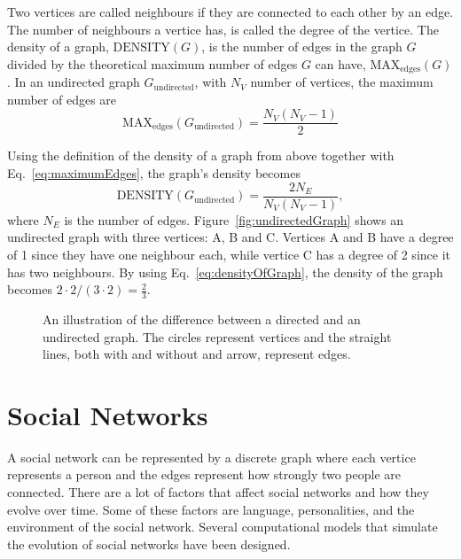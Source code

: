 Two vertices are called neighbours if they are connected to each other by an edge. The number of neighbours a vertice has, is called the degree of the vertice. The density of a graph, $\mathrm{DENSITY}(G)$, is the number of edges in the graph $G$ divided by the theoretical maximum number of edges $G$ can have, $\mathrm{MAX}_\mathrm{edges}(G)$. In an undirected graph $G_\mathrm{undirected}$, with $N_V$ number of vertices, the maximum number of edges are
\begin{equation}\label{eq:maximumEdges}
\mathrm{MAX}_\mathrm{edges}(G_\mathrm{undirected}) = \frac{N_V(N_V-1)}{2}
\end{equation}

Using the definition of the density of a graph from above together with Eq.~\eqref{eq:maximumEdges}, the graph's density becomes
\begin{equation}\label{eq:densityOfGraph}
\mathrm{DENSITY}(G_\mathrm{undirected}) = \frac{2 N_E}{N_V(N_V-1)},
\end{equation}
where $N_E$ is the number of edges. Figure~\ref{fig:undirectedGraph} shows an undirected graph with three vertices: A, B and C. Vertices A and B have a degree of 1 since they have one neighbour each, while vertice C has a degree of 2 since it has two neighbours. By using Eq.~\eqref{eq:densityOfGraph}, the density of the graph becomes $2\cdot2 / (3\cdot2) = \frac{2}{3}$.

\begin{figure}[htbp]
    \centering
    \hfill
    \hfill
    \hfill
    \caption[The difference between a directed and an undirected graph.]{An illustration of the difference between  a directed and  an undirected graph. The circles represent vertices and the straight lines, both with and without and arrow, represent edges.}
    \label{fig:graph}
\end{figure}

\acresetall
\section{Social Networks}
A social network can be represented by a discrete graph where each vertice represents a person and the edges represent how strongly two people are connected. There are a lot of factors that affect social networks and how they evolve over time. Some of these factors are language, personalities, and the environment of the social network. Several computational models that simulate the evolution of social networks have been designed. 

